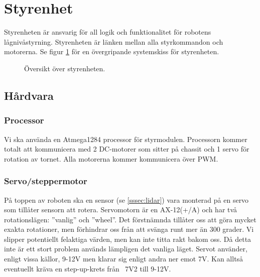 \documentclass[a4paper,11pt]{article}
\begin{document}
\newpage
\section{Styrenhet} \label{sec:system2}
Styrenheten är ansvarig för all logik och funktionalitet för robotens lågnivåstyrning. Styrenheten är länken mellan alla styrkommandon och motorerna. Se figur \ref{fig:unitMotorcontroller} för en övergripande systemskiss för styrenheten.

\begin{figure}[h!]
    \caption{Översikt över styrenheten.}
    \label{fig:unitMotorcontroller}
\end{figure}

\subsection{Hårdvara}

\subsubsection{Processor}
Vi ska använda en Atmega1284 processor för styrmodulen. Processorn kommer totalt att kommunicera med 2 DC-motorer som sitter på chassit och 1 servo för rotation av tornet. Alla motorerna kommer kommunicera över PWM.

\subsubsection{Servo/steppermotor} \label{ssec:servomotor}
På toppen av roboten ska en sensor (se \ref{sssec:lidar}) vara monterad på en servo som tillåter sensorn att rotera. Servomotorn är en AX-12(+/A) och har två rotationslägen: ''vanlig'' och ''wheel''. Det förstnämnda tillåter oss att göra mycket exakta rotationer, men förhindrar oss från att svänga runt mer än 300 grader. Vi slipper potentiellt felaktiga värden, men kan inte titta rakt bakom oss. Då detta inte är ett stort problem används lämpligen det vanliga läget. Servot använder, enligt vissa källor, 9-12V men klarar sig enligt andra ner emot 7V. Kan alltså eventuellt kräva en step-up-krets från ~7V2 till 9-12V.
\end{document}

